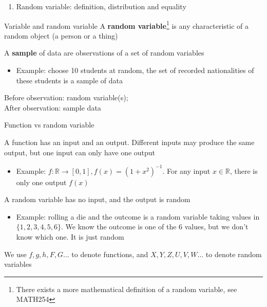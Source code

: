 \documentclass{beamer}
\newcommand{\R}{\mathbb R}
\begin{document}
\begin{frame}
\begin{enumerate}
\item Random variable: definition, distribution and equality 
\end{enumerate}
\end{frame}

\begin{frame}{Variable and random variable}
A {\bf random variable}\footnote{There exists a more mathematical definition of a random variable, see MATH254} is any characteristic of a random object (a person or a thing)




A {\bf sample} of data are observations of a set of random variables

\begin{itemize}
\item Example: choose 10 students at random, the set of recorded nationalities of these students is a sample of data
\end{itemize}

Before observation: random variable(s); \\
After observation: sample data
\end{frame}




\begin{frame}{Function vs random variable}

A function has an input and an output. Different inputs may produce the same output, but one input can only have one output 
\begin{itemize}
\item Example: $f:\R\to[0,1], f(x)=(1+x^2)^{-1}.$ For any input $x\in\R$, there is only one output $f(x)$
\end{itemize}



A random variable has no input, and the output is random
\begin{itemize}
\item Example: rolling a die and the outcome is a random variable taking values in $\{1,2,3,4,5,6\}$. We know the outcome is one of the 6 values, but we don't know which one. It is just random
\end{itemize}
We use $f,g,h, F, G\ldots$ to denote functions, and $X,Y,Z,U,V,W\ldots$ to denote random variables
\end{frame}
\end{document}
